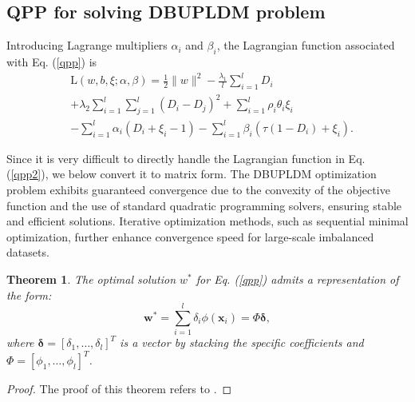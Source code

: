 \documentclass[a4paper]{cas-sc}
\newtheorem{myTheo}{Theorem}
\begin{document}

\subsection{QPP for solving DBUPLDM problem}\label{3.2}
Introducing Lagrange multipliers $\alpha_{i}$ and $\beta_{i}$, the Lagrangian function  associated with Eq. (\ref{qpp}) is
\begin{equation}
\label{qpp2}
\begin{aligned}
&\mathrm{L}(w, b, \xi ; \alpha, \beta)=\frac{1}{2}\|w\|^{2}-\frac{\lambda_{1}}{l} \sum_{i=1}^{l} D_{i} \\
&+\lambda_{2} \sum_{i=1}^{l} \sum_{j=1}^{l}\left(D_{i}-D_{j}\right)^{2}+\sum_{i=1}^{l} \rho_{i}\theta_{i} \xi_{i} \\
&-\sum_{i=1}^{l} \alpha_{i}\left(D_{i}+\xi_{i}-1\right)-\sum_{i=1}^{l} \beta_{i}\left(\tau\left(1-D_{i}\right)+\xi_{i}\right).
\end{aligned}
\end{equation}

Since it is very difficult to directly handle the Lagrangian function in Eq. (\ref{qpp2}), we below convert it to matrix form. 
{\color{blue}The DBUPLDM optimization problem exhibits guaranteed convergence due to the convexity of the objective function and the use of standard quadratic programming solvers,  ensuring stable and efficient solutions. Iterative optimization methods, such as sequential minimal optimization, further enhance convergence speed for large-scale imbalanced datasets.}
\begin{myTheo}
\label{theo1}
The optimal solution $w^*$ for Eq. (\ref{qpp}) admits a representation of the form:
\begin{equation}
\label{thor}
\boldsymbol{w}^{*}=\sum_{i=1}^{l} \delta_{i} \phi\left(\boldsymbol{x}_{i}\right)=\Phi \boldsymbol{\delta},
\end{equation}
where $\boldsymbol{\delta}=\left[\delta_{1}, \ldots, \delta_{l}\right]^{T}$ is a vector by stacking the specific coefficients and $\Phi=\left[\phi_{1}, \ldots, \phi_{l}\right]^{T}$.
\end{myTheo}

\begin{proof}
The proof of this theorem refers to \citep{smola2002support}.
\end{proof}
\end{document}
